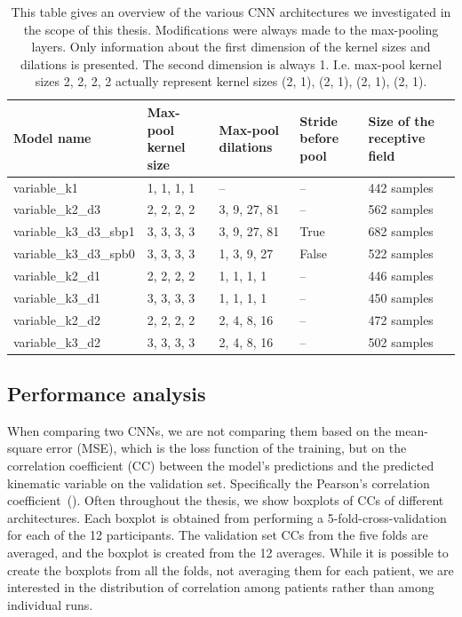 \begin{table}[!htpb]
\centering
\begin{tabular}{|p{3.7cm}|p{1.7cm}|p{2cm}|p{1.2cm}|p{2.5cm}|}
\toprule
Model name & Max-pool kernel size & Max-pool dilations & Stride before pool & Size of the receptive field \\
\midrule
variable\_k1 & 1, 1, 1, 1 & -- & -- & 442 samples \\
\hline
variable\_k2\_d3 & 2, 2, 2, 2 & 3, 9, 27, 81 & -- & 562 samples \\
\hline
variable\_k3\_d3\_sbp1 & 3, 3, 3, 3 & 3, 9, 27, 81 & True & 682 samples \\
\hline
variable\_k3\_d3\_spb0 & 3, 3, 3, 3  & 1, 3, 9, 27 & False & 522 samples \\
\hline
variable\_k2\_d1 & 2, 2, 2, 2 & 1, 1, 1, 1 & -- & 446 samples \\
\hline
variable\_k3\_d1 & 3, 3, 3, 3  & 1, 1, 1, 1 & -- & 450 samples \\
\hline
variable\_k2\_d2 & 2, 2, 2, 2 & 2, 4, 8, 16 & -- & 472 samples \\
\hline
variable\_k3\_d2 & 3, 3, 3, 3 & 2, 4, 8, 16 & -- & 502 samples \\
\hline
\bottomrule
\end{tabular}
\caption[Architectural modifications]{This table gives an overview of the various CNN architectures we investigated in the scope of this thesis.
Modifications were always made to the max-pooling layers.
Only information about the first dimension of the kernel sizes and dilations is presented.
The second dimension is always 1.
I.e. max-pool kernel sizes 2, 2, 2, 2 actually represent kernel sizes (2, 1), (2, 1), (2, 1), (2, 1). }
\label{tab:architectures-description}
\end{table}

\subsection{Performance analysis}\label{subsec:performance-analysis}
When comparing two CNNs, we are not comparing them based on the mean-square error (MSE), which is the loss function of the training, but on the correlation coefficient (CC) between the model's predictions and the predicted kinematic variable on the validation set.
Specifically the Pearson's correlation coefficient~(\cite{pearson-vii-1895}).
Often throughout the thesis, we show boxplots of CCs of different architectures.
Each boxplot is obtained from performing a 5-fold-cross-validation for each of the 12 participants.
The validation set CCs from the five folds are averaged, and the boxplot is created from the 12 averages.
While it is possible to create the boxplots from all the folds, not averaging them for each patient, we are interested in the distribution of correlation among patients rather than among individual runs.